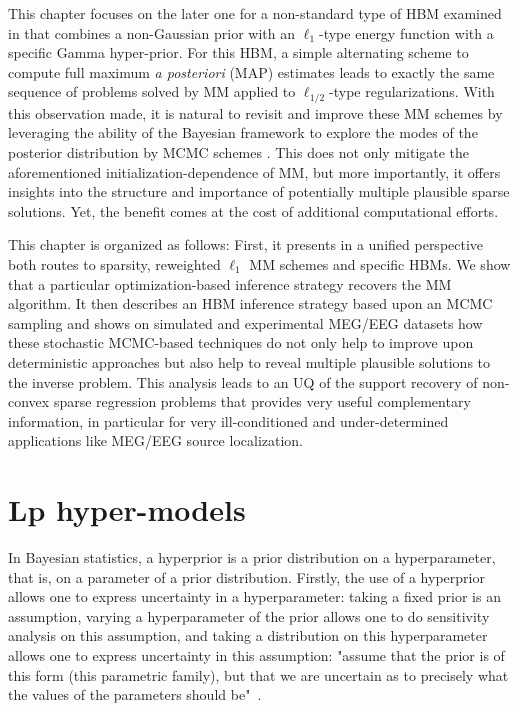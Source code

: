 This chapter focuses on the later one for a non-standard type of \ac{HBM} examined in \cite{Lu14} that combines a non-Gaussian prior with an $\ell_{1}$-type energy function with a specific Gamma hyper-prior.
For this \ac{HBM}, a simple alternating scheme to compute full maximum \emph{a posteriori} (MAP) estimates leads to exactly the same sequence of problems solved by \ac{MM} applied to $\ell_{1/2}$-type regularizations.
With this observation made, it is natural to revisit and improve these \ac{MM} schemes by leveraging the ability of the Bayesian framework to explore the modes of the posterior distribution by \ac{MCMC} schemes \cite{RoCa05,KaSo05}. This does not only mitigate the aforementioned initialization-dependence of \ac{MM}, but more importantly, it offers insights into the structure and importance of potentially multiple plausible sparse solutions. Yet, the benefit comes at the cost of additional computational efforts.

This chapter is organized as follows: First, it presents in a unified
perspective both routes to sparsity, \textit{\ie} reweighted $\ell_1$ MM schemes
and specific HBMs. We show that a particular optimization-based inference strategy recovers the MM algorithm. It then describes an \ac{HBM} inference strategy based upon an \ac{MCMC} sampling and shows on simulated and experimental MEG/EEG datasets how these stochastic \ac{MCMC}-based techniques do not only help to improve upon deterministic approaches but also help to reveal multiple plausible solutions to the inverse problem. This analysis leads to an \ac{UQ} of the support recovery of non-convex sparse regression problems that provides very useful complementary information, in particular for very ill-conditioned and under-determined applications like MEG/EEG source localization.

\section{Lp hyper-models}
In Bayesian statistics, a hyperprior is a prior distribution on a hyperparameter, that is, on a parameter of a prior distribution.
Firstly, the use of a hyperprior allows one to express uncertainty in a hyperparameter: taking a fixed prior is an assumption, varying a hyperparameter of the prior allows one to do sensitivity analysis on this assumption, and taking a distribution on this hyperparameter allows one to express uncertainty in this assumption: "assume that the prior is of this form (this parametric family), but that we are uncertain as to precisely what the values of the parameters should be"~\cite{bernardo2001bayesian}.


